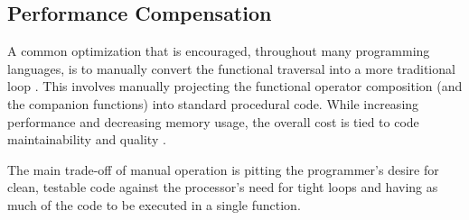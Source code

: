 \begin{minipage}{\linewidth}

\end{minipage} 

\subsection{Performance Compensation}
A common optimization that is encouraged, throughout many programming languages, is to manually convert the functional traversal into a more traditional  loop \cite{iterperf09} \cite{iterperf10} \cite{iterperf11}.  This involves manually projecting the functional operator composition (and the companion functions) into standard procedural code.  While increasing performance and decreasing memory usage, the overall cost is tied to code maintainability and quality \cite{langstudy14}.  

The main trade-off of manual operation is pitting the programmer's desire for clean, testable code against the processor's need for tight loops and having as much of the code to be executed in a single function.  